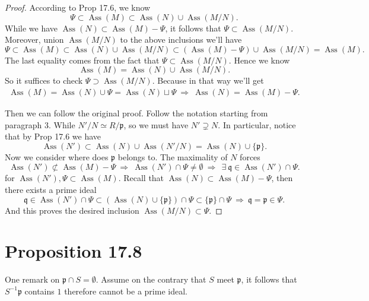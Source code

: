 \begin{proof}
    According to Prop 17.6, we know 
    \[\Psi\subset \operatorname{Ass}(M)\subset \operatorname{Ass}(N)\cup\operatorname{Ass}(M/N).\]
    While we have $\operatorname{Ass}(N)\subset \operatorname{Ass}(M)-\Psi$, it follows that $\Psi\subset \operatorname{Ass}(M/N)$. Moreover, union $\operatorname{Ass}(M/N)$ to the above inclusions we'll have 
    \[\Psi\subset \operatorname{Ass}(M)\subset \operatorname{Ass}(N)\cup\operatorname{Ass}(M/N)\subset (\operatorname{Ass}(M)-\Psi)\cup\operatorname{Ass}(M/N)=\operatorname{Ass}(M).\]
    The last equality comes from the fact that $\Psi\subset \operatorname{Ass}(M/N)$. Hence we know 
    \[\operatorname{Ass}(M)=\operatorname{Ass}(N)\cup \operatorname{Ass}(M/N).\]
    So it suffices to check $\Psi\supset \operatorname{Ass}(M/N)$. Because in that way we'll get 
    \begin{align*}
        \operatorname{Ass}(M)=\operatorname{Ass}(N)\cup \Psi=\operatorname{Ass}(N)\sqcup \Psi ~\Rightarrow~ \operatorname{Ass}(N)=\operatorname{Ass}(M)-\Psi.
    \end{align*}

    Then we can follow the original proof. Follow the notation starting from paragraph 3. While $N'/N\simeq R/\mathfrak p$, so we must have $N'\supsetneq N$.
    In particular, notice that by Prop 17.6 we have 
    \[\operatorname{Ass}(N')\subset \operatorname{Ass}(N)\cup\operatorname{Ass}(N'/N)=\operatorname{Ass}(N)\cup\{\mathfrak p\}.\]
    Now we consider where does $\mathfrak p$ belongs to. 
    The maximality of $N$ forces \[\operatorname{Ass}(N')\not\subset \operatorname{Ass}(M)-\Psi ~\Rightarrow~ \operatorname{Ass}(N')\cap \Psi\neq\emptyset ~\Rightarrow~ ~\exists ~\mathfrak q\in \operatorname{Ass}(N')\cap \Psi.\] for $\operatorname{Ass}(N'),\Psi\subset \operatorname{Ass}(M)$. Recall that $\operatorname{Ass}(N)\subset \operatorname{Ass}(M)-\Psi$, then there exists a prime ideal 
    \[\mathfrak q\in \operatorname{Ass}(N')\cap\Psi\subset (\operatorname{Ass}(N)\cup\{\mathfrak p\})\cap\Psi\subset\{\mathfrak p\}\cap\Psi ~\Rightarrow~ \mathfrak q=\mathfrak p\in\Psi.\]
    And this proves the desired inclusion $\operatorname{Ass}(M/N)\subset \Psi$.

\end{proof}


\section{Proposition 17.8}

One remark on $\mathfrak p\cap S=\emptyset$. Assume on the contrary that $S$ meet $\mathfrak p$, it follows that $S^{-1}\mathfrak p$ contains $1$ therefore cannot be a prime ideal.

